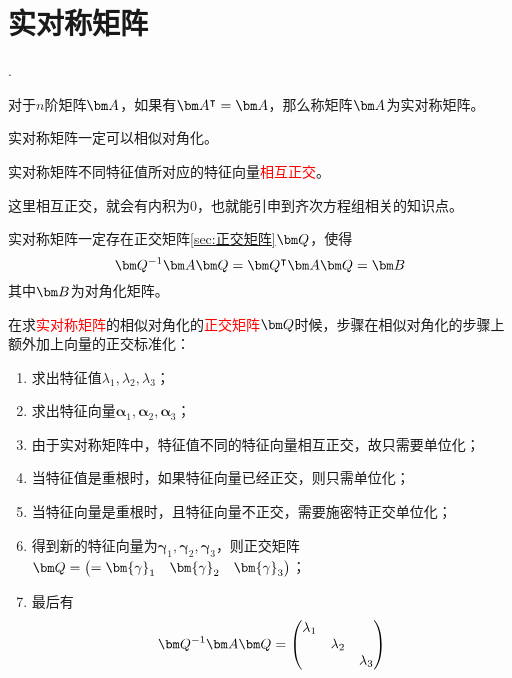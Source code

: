 \section{实对称矩阵}
.
\begin{definition}
    对于$n$阶矩阵$\mat{A}$，如果有$\mat{A}^\intercal = \mat{A}$，那么称矩阵$\mat{A}$为实对称矩阵。
\end{definition}
\begin{theorem}
    实对称矩阵一定可以相似对角化。
\end{theorem}
\begin{theorem}
    实对称矩阵不同特征值所对应的特征向量\textcolor{red}{相互正交}。
\end{theorem}
这里相互正交，就会有内积为$0$，也就能引申到齐次方程组相关的知识点。

\begin{theorem}
    实对称矩阵一定存在正交矩阵\ref{sec:正交矩阵}$\mat{Q}$，使得
    \[ \mat{Q}^{-1}\mat{A}\mat{Q} = \mat{Q}^\intercal \mat{A}\mat{Q} = \mat{B} \]
    其中$\mat{B}$为对角化矩阵。
\end{theorem}
在求\textcolor{red}{实对称矩阵}的相似对角化的\textcolor{red}{正交矩阵$\mat{Q}$}时候，步骤在相似对角化的步骤上额外加上向量的正交标准化：
\begin{enumerate}[(1)]
    \item 求出特征值$\lambda_1,\lambda_2,\lambda_3$；
    \item 求出特征向量$\bm{\alpha}_1,\bm{\alpha}_2,\bm{\alpha}_3$；
    \item 由于实对称矩阵中，特征值不同的特征向量相互正交，故只需要单位化；
    \item 当特征值是重根时，如果特征向量已经正交，则只需单位化；
    \item 当特征向量是重根时，且特征向量不正交，需要施密特正交单位化；
    \item 得到新的特征向量为$\bm{\gamma}_1,\bm{\gamma}_2,\bm{\gamma}_3$，则正交矩阵$\mat{Q}=\begin{pmatrix}=\bm{\gamma}_1 & \bm{\gamma}_2 & \bm{\gamma}_3\end{pmatrix}$；
    \item 最后有
          \[
              \mat{Q}^{-1}\mat{A}\mat{Q} =
              \begin{pmatrix}
                  \lambda_1 &           &           \\
                            & \lambda_2 &           \\
                            &           & \lambda_3
              \end{pmatrix}
          \]
\end{enumerate}


